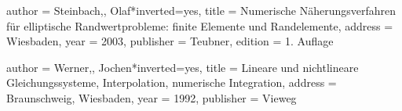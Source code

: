 \begin{bibdiv}
\begin{biblist}
 {
    author = {{Steinbach,}, Olaf}*{inverted={yes}},
    title = {Numerische Näherungsverfahren für elliptische Randwertprobleme: finite Elemente und Randelemente},
    address = {Wiesbaden},
    year = {2003},
    publisher = {Teubner},
    edition = {1. Auflage}
}

 {
    author = {{Werner,}, Jochen}*{inverted={yes}},
    title = {Lineare und nichtlineare Gleichungssysteme, Interpolation, numerische Integration},
    address = {Braunschweig, Wiesbaden},
    year = {1992},
    publisher = {Vieweg}
}

\end{biblist}
\end{bibdiv}
